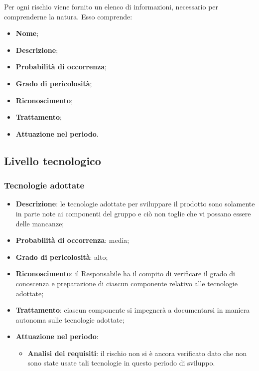 Per ogni rischio viene fornito un elenco di informazioni, necessario per comprenderne la natura. Esso comprende:
\begin{itemize}
	\item \textbf{Nome};
	\item \textbf{Descrizione};
	\item \textbf{Probabilità di occorrenza};
	\item \textbf{Grado di pericolosità};
	\item \textbf{Riconoscimento};
	\item \textbf{Trattamento};
	\item \textbf{Attuazione nel periodo}.
\end{itemize}
	\subsection{Livello tecnologico}
		\subsubsection{Tecnologie adottate}
		\begin{itemize}
			\item \textbf{Descrizione}: le tecnologie adottate per sviluppare il prodotto sono solamente in parte note ai componenti del gruppo e ciò non toglie che vi possano essere delle mancanze;
			\item \textbf{Probabilità di occorrenza}: media;
			\item \textbf{Grado di pericolosità}: alto;
			\item \textbf{Riconoscimento}: il Responsabile ha il compito di verificare il grado di conoscenza e preparazione di ciascun componente relativo alle tecnologie adottate;
			\item \textbf{Trattamento}: ciascun componente si impegnerà a documentarsi in maniera autonoma sulle tecnologie adottate;
			\item \textbf{Attuazione nel periodo}:
			\begin{itemize}
				\item \textbf{Analisi dei requisiti}: il rischio non si è ancora verificato dato che non sono state usate tali tecnologie in questo periodo di sviluppo.
			\end{itemize}
		\end{itemize}

